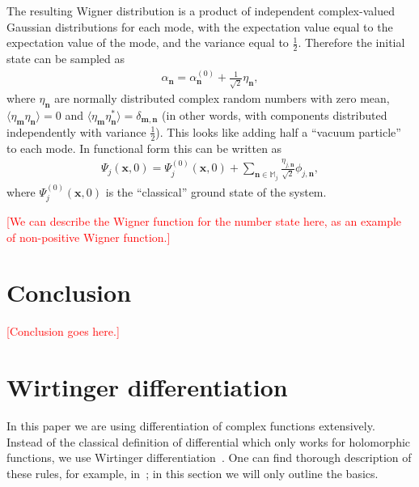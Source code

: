 \documentclass[12pt,aip,jmp,amssymb,amsmath]{revtex4-1}
\newcommand{\todo}[1]{\textcolor{red}{[#1]}}
\newcommand{\mvec}{\boldsymbol{m}}
\newcommand{\nvec}{\boldsymbol{n}}
\newcommand{\xvec}{\boldsymbol{x}}
\newcommand{\restbasis}{\mathbb{M}}
\begin{document}
The resulting Wigner distribution is a product of independent complex-valued Gaussian distributions for each mode,
with the expectation value equal to the expectation value of the mode,
and the variance equal to $\frac{1}{2}$.
Therefore the initial state can be sampled as
\begin{equation}\begin{split}
    \alpha_{\nvec} = \alpha_{\nvec}^{(0)} + \frac{1}{\sqrt{2}} \eta_{\nvec},
\end{split}\end{equation}
where $\eta_{\nvec}$ are normally distributed complex random numbers with zero mean,
$\langle \eta_{\mvec} \eta_{\nvec} \rangle = 0$ and
$\langle \eta_{\mvec} \eta_{\nvec}^* \rangle = \delta_{\mvec,\nvec}$
(in other words, with components distributed independently with variance $\frac{1}{2}$).
This looks like adding half a ``vacuum particle'' to each mode.
In functional form this can be written as
\begin{equation}\begin{split}
    \Psi_j(\xvec, 0)
    = \Psi_j^{(0)}(\xvec, 0)
        + \sum_{\nvec \in \restbasis_j} \frac{\eta_{j,\nvec}}{\sqrt{2}} \phi_{j,\nvec},
\end{split}\end{equation}
where $\Psi_j^{(0)}(\xvec, 0)$ is the ``classical'' ground state of the system.

\todo{We can describe the Wigner function for the number state here, as an example of non-positive Wigner function.}



\section{Conclusion}

\todo{Conclusion goes here.}


\appendix



\section{Wirtinger differentiation}

In this paper we are using differentiation of complex functions extensively.
Instead of the classical definition of differential which only works for holomorphic functions, we use Wirtinger differentiation~\cite{Wirtinger1927}.
One can find thorough description of these rules, for example, in~\cite{Kreutz-Delgado2009}; in this section we will only outline the basics.
\end{document}
